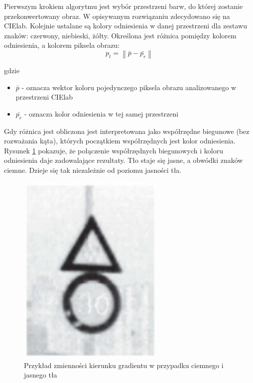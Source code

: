 Pierwszym krokiem algorytmu jest wybór przestrzeni barw, do której zostanie przekonwertowany obraz. W opisywanym rozwiązaniu zdecydowano się na CIElab. Kolejnie ustalane są kolory odniesienia w danej przestrzeni dla zestawu znaków: czerwony, niebieski, żółty.
Określona jest różnica pomiędzy kolorem odniesienia, a kolorem piksela obrazu:
\begin{equation}
p_t=\left \| \bar{p} - \bar{p_r} \right \|
\end{equation}

gdzie
\begin{itemize}
\item{$\bar{p}$ - oznacza wektor koloru pojedynczego piksela obrazu analizowanego w przestrzeni CIElab}
\item{$\bar{p_r}$ - oznacza kolor odniesienia w tej samej przestrzeni}
\end{itemize}

Gdy różnica jest obliczona jest interpretowana jako współrzędne biegunowe (bez rozważania kąta), których początkiem współrzędnych jest kolor odniesienia. Rysunek \ref{fig:sign_detection2_result} pokazuje, że połączenie współrzędnych biegunowych i koloru odniesienia daje zadowalające rezultaty. Tło staje się jasne, a obwódki znaków ciemne. Dzieje się tak niezależnie od poziomu jasności tła.

\begin{figure}
  \centering
  \includegraphics[width=7cm]{img/sign_detection2_result.png}
  \caption{Przykład zmienności kierunku gradientu w przypadku ciemnego i jasnego tła\cite{T7}}
  \label{fig:sign_detection2_result}
\end{figure}


